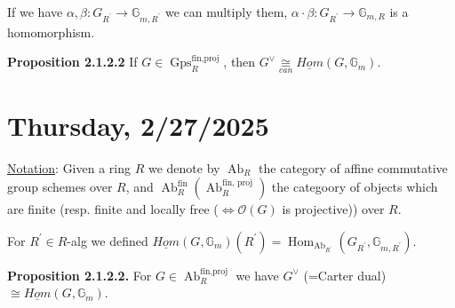 \documentclass{article}
\theoremstyle{definition}
\numberwithin{theorem}{subsection}
\begin{document}
    If we have \(\alpha ,\beta: G_{R^{\prime}}\to \mathbb{G}_{m,R^{\prime}}\) we can multiply them, \(\alpha \cdot \beta : G_{R^{\prime}} \to \mathbb{G}_{m,R}\) is a homomorphism. 

    \textbf{Proposition 2.1.2.2} If \(G\in \operatorname{Gps}_R^{\text{fin,proj}}\), then \(G^\vee \underset{can}{\cong} \underline{Hom}(G,\mathbb{G}_{m})\). 

    \section*{Thursday, 2/27/2025}
    
    \underline{Notation}: Given a ring \(R\) we denote by \(\operatorname{Ab}_R\) the category of affine commutative group schemes over \(R\), and \(\operatorname{Ab}_R^{\text{fin}} (\operatorname{Ab}_R^{\text{fin, proj}})\) the categoory of objects which are finite (resp. finite and locally free (\(\iff \mathcal{O}(G)\) is projective)) over \(R\).
    
    For \(R^{\prime} \in R\)-alg we defined \(\underline{Hom}(G,\mathbb{G}_m)(R^{\prime}) = \operatorname{Hom}_{\operatorname{Ab}_{R^{\prime}}}(G_{R^{\prime}}, \mathbb{G}_{m,R^{\prime}})\).
    
    \textbf{Proposition 2.1.2.2.} For \(G\in \operatorname{Ab}_R^{\text{fin,proj}}\) we have \(G^\vee\) (=Carter dual) \(\cong \underline{Hom}(G,\mathbb{G}_m)\).
    
\end{document}

